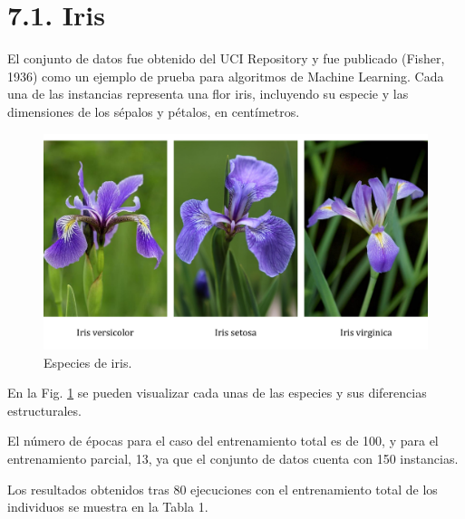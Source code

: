 \documentclass[spanish,a4paper,12pt,twoside]{report}
\begin{document}
  \section*{\Large 7.1. Iris}
  El conjunto de datos fue obtenido del UCI Repository y fue publicado (Fisher, 1936) como un ejemplo de prueba para algoritmos de Machine Learning. Cada una de las instancias representa una flor iris, incluyendo su especie y las dimensiones de los sépalos y pétalos, en centímetros. \par
  \begin{figure}[H]
    \centering
    \includegraphics[width = 1\textwidth]{resources/Fig17.pdf}
    \caption{Especies de iris.}
    \label{fig:17}
  \end{figure} \vfill
  En la Fig. \ref{fig:17} se pueden visualizar cada unas de las especies y sus diferencias estructurales. \par
  El número de épocas para el caso del entrenamiento total es de 100, y para el entrenamiento parcial, 13, ya que el conjunto de datos cuenta con 150 instancias. \par
  Los resultados obtenidos tras 80 ejecuciones con el entrenamiento total de los individuos se muestra en la Tabla 1.
\end{document}
